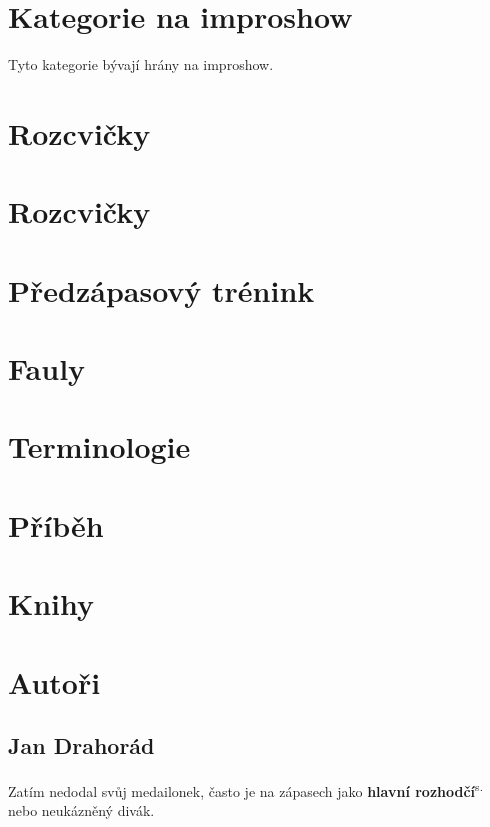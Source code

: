 \documentclass[a4paper,10pt,openany]{book}
\newcommand{\odkaz}[2]{\textbf{#1}\textsuperscript{s.~\pageref{#2}}}
\begin{document}
\chapter{Kategorie na improshow}\label{další kategorie}
\label{:kategorie:kategorie na improshow}
Tyto kategorie bývají hrány na improshow.


\chapter{Rozcvičky}

\chapter{Rozcvičky}\label{rozcvičky}
\label{:kategorie:rozcvičky}






\chapter{Předzápasový trénink}


\chapter{Fauly}\label{fauly}

\label{:kategorie:fauly}
 
 

\chapter{Terminologie}\label{terminologie}
\label{:kategorie:terminologie}


\chapter{Příběh}



\chapter{Knihy}\label{knihy}



\chapter{Autoři}\label{autori}
\section{Jan Drahorád}
Zatím nedodal svůj medailonek, často je na zápasech jako \odkaz{hlavní rozhodčí}{rozhodčí} nebo neukázněný divák.
\end{document}

